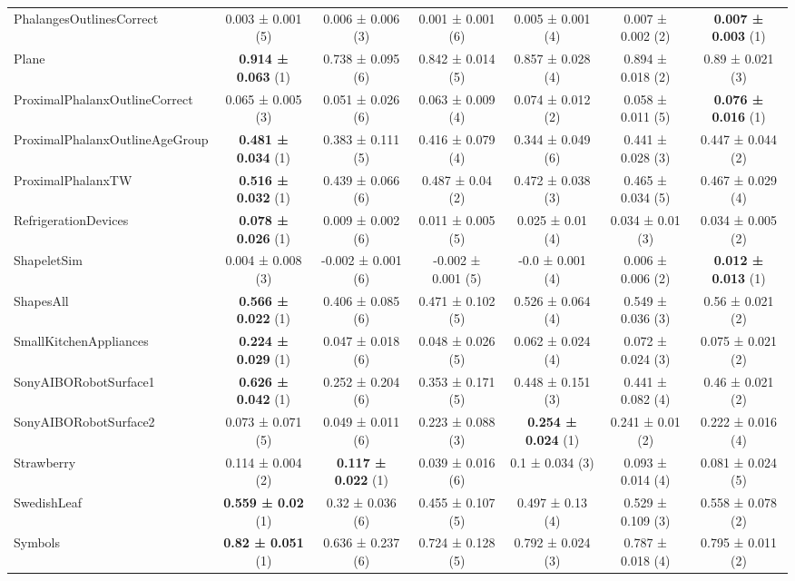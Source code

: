 \begin{table}[ht]
\begin{adjustbox}{width=\textwidth}
\begin{tabular}{lcccccc}
    PhalangesOutlinesCorrect & 0.003 ± 0.001 (5) & 0.006 ± 0.006 (3) & 0.001 ± 0.001 (6) & 0.005 ± 0.001 (4) & 0.007 ± 0.002 (2) & \textbf{0.007 ± 0.003} (1) \\
    Plane & \textbf{0.914 ± 0.063} (1) & 0.738 ± 0.095 (6) & 0.842 ± 0.014 (5) & 0.857 ± 0.028 (4) & 0.894 ± 0.018 (2) & 0.89 ± 0.021 (3) \\
    ProximalPhalanxOutlineCorrect & 0.065 ± 0.005 (3) & 0.051 ± 0.026 (6) & 0.063 ± 0.009 (4) & 0.074 ± 0.012 (2) & 0.058 ± 0.011 (5) & \textbf{0.076 ± 0.016} (1) \\
    ProximalPhalanxOutlineAgeGroup & \textbf{0.481 ± 0.034} (1) & 0.383 ± 0.111 (5) & 0.416 ± 0.079 (4) & 0.344 ± 0.049 (6) & 0.441 ± 0.028 (3) & 0.447 ± 0.044 (2) \\
    ProximalPhalanxTW & \textbf{0.516 ± 0.032} (1) & 0.439 ± 0.066 (6) & 0.487 ± 0.04 (2) & 0.472 ± 0.038 (3) & 0.465 ± 0.034 (5) & 0.467 ± 0.029 (4) \\
    RefrigerationDevices & \textbf{0.078 ± 0.026} (1) & 0.009 ± 0.002 (6) & 0.011 ± 0.005 (5) & 0.025 ± 0.01 (4) & 0.034 ± 0.01 (3) & 0.034 ± 0.005 (2) \\
    ShapeletSim & 0.004 ± 0.008 (3) & -0.002 ± 0.001 (6) & -0.002 ± 0.001 (5) & -0.0 ± 0.001 (4) & 0.006 ± 0.006 (2) & \textbf{0.012 ± 0.013} (1) \\
    ShapesAll & \textbf{0.566 ± 0.022} (1) & 0.406 ± 0.085 (6) & 0.471 ± 0.102 (5) & 0.526 ± 0.064 (4) & 0.549 ± 0.036 (3) & 0.56 ± 0.021 (2) \\
    SmallKitchenAppliances & \textbf{0.224 ± 0.029} (1) & 0.047 ± 0.018 (6) & 0.048 ± 0.026 (5) & 0.062 ± 0.024 (4) & 0.072 ± 0.024 (3) & 0.075 ± 0.021 (2) \\
    SonyAIBORobotSurface1 & \textbf{0.626 ± 0.042} (1) & 0.252 ± 0.204 (6) & 0.353 ± 0.171 (5) & 0.448 ± 0.151 (3) & 0.441 ± 0.082 (4) & 0.46 ± 0.021 (2) \\
    SonyAIBORobotSurface2 & 0.073 ± 0.071 (5) & 0.049 ± 0.011 (6) & 0.223 ± 0.088 (3) & \textbf{0.254 ± 0.024} (1) & 0.241 ± 0.01 (2) & 0.222 ± 0.016 (4) \\
    Strawberry & 0.114 ± 0.004 (2) & \textbf{0.117 ± 0.022} (1) & 0.039 ± 0.016 (6) & 0.1 ± 0.034 (3) & 0.093 ± 0.014 (4) & 0.081 ± 0.024 (5) \\
    SwedishLeaf & \textbf{0.559 ± 0.02} (1) & 0.32 ± 0.036 (6) & 0.455 ± 0.107 (5) & 0.497 ± 0.13 (4) & 0.529 ± 0.109 (3) & 0.558 ± 0.078 (2) \\
    Symbols & \textbf{0.82 ± 0.051} (1) & 0.636 ± 0.237 (6) & 0.724 ± 0.128 (5) & 0.792 ± 0.024 (3) & 0.787 ± 0.018 (4) & 0.795 ± 0.011 (2) \\

\end{tabular}
\end{adjustbox}
\end{table}
